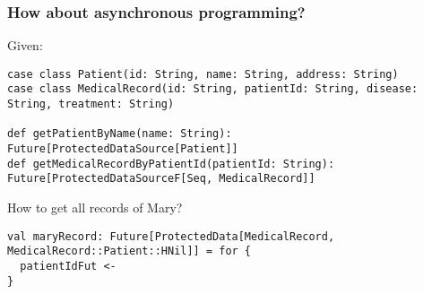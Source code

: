 \documentclass[aspectratio=169]{beamer}
\begin{document}
\begin{frame}[fragile]
\frametitle{How about asynchronous programming?}
Given:
\begin{lstlisting}[style=myScalastyle,frame=none]
case class Patient(id: String, name: String, address: String)
case class MedicalRecord(id: String, patientId: String, disease: String, treatment: String)

def getPatientByName(name: String): Future[ProtectedDataSource[Patient]]
def getMedicalRecordByPatientId(patientId: String): Future[ProtectedDataSourceF[Seq, MedicalRecord]]
\end{lstlisting}
How to get all records of Mary?
\pause
\begin{lstlisting}[style=myScalastyle,frame=none]
val maryRecord: Future[ProtectedData[MedicalRecord, MedicalRecord::Patient::HNil]] = for {
  patientIdFut <- 
}
\end{lstlisting}

\end{frame}
\end{document}
